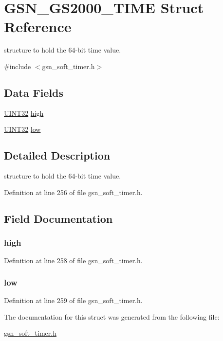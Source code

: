 \hypertarget{a00083}{
\section{GSN\_\-GS2000\_\-TIME Struct Reference}
\label{a00083}
}


structure to hold the 64-\/bit time value.  




{\ttfamily \#include $<$gsn\_\-soft\_\-timer.h$>$}

\subsection*{Data Fields}
\begin{DoxyCompactItemize}
\item 
\hyperlink{a00660_gae1e6edbbc26d6fbc71a90190d0266018}{UINT32} \hyperlink{a00083_a0da0781bcf01db06fd2d83ba9734a2ed}{high}
\item 
\hyperlink{a00660_gae1e6edbbc26d6fbc71a90190d0266018}{UINT32} \hyperlink{a00083_a3e2b5499a31a9ebb427fb8019faeef7d}{low}
\end{DoxyCompactItemize}


\subsection{Detailed Description}
structure to hold the 64-\/bit time value. 

Definition at line 256 of file gsn\_\-soft\_\-timer.h.



\subsection{Field Documentation}
\hypertarget{a00083_a0da0781bcf01db06fd2d83ba9734a2ed}{
\subsubsection[{high}]{ {\bf high}}}
\label{a00083_a0da0781bcf01db06fd2d83ba9734a2ed}


Definition at line 258 of file gsn\_\-soft\_\-timer.h.

\hypertarget{a00083_a3e2b5499a31a9ebb427fb8019faeef7d}{
\subsubsection[{low}]{ {\bf low}}}
\label{a00083_a3e2b5499a31a9ebb427fb8019faeef7d}


Definition at line 259 of file gsn\_\-soft\_\-timer.h.



The documentation for this struct was generated from the following file:\begin{DoxyCompactItemize}
\item 
\hyperlink{a00586}{gsn\_\-soft\_\-timer.h}\end{DoxyCompactItemize}
